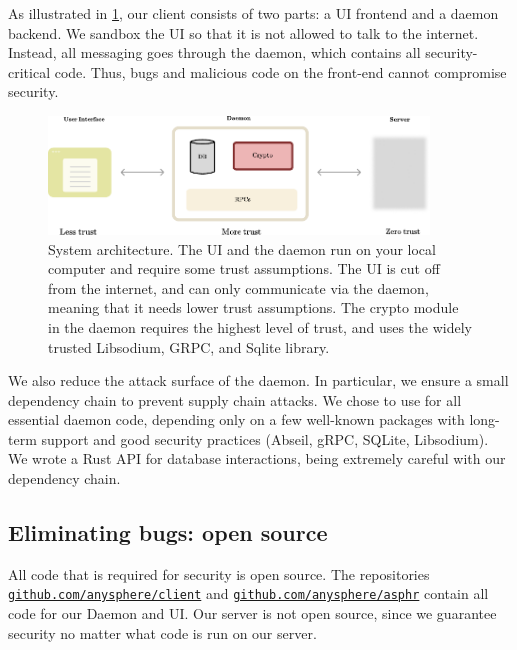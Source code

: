 As illustrated in \cref{fig:systemdiagram}, our client consists of two parts: a UI frontend and a daemon backend. We sandbox the UI so that it is not allowed to talk to the internet. Instead, all messaging goes through the daemon, which contains all security-critical code. Thus, bugs and malicious code on the front-end cannot compromise security.
\begin{figure}
    \centering
    \includegraphics[width=0.9\textwidth]{systemdiagram.pdf}
\caption{System architecture. The UI and the daemon run on your local computer and require some trust assumptions. The UI is cut off from the internet, and can only communicate via the daemon, meaning that it needs lower trust assumptions. The crypto module in the daemon requires the highest level of trust, and uses the widely trusted Libsodium, GRPC, and Sqlite library.}
\label{fig:systemdiagram}
\end{figure}

We also reduce the attack surface of the daemon. In particular, we ensure a small dependency chain to prevent supply chain attacks. We chose to use \Cpp for all essential daemon code, depending only on a few well-known packages with long-term support and good security practices (Abseil, gRPC, SQLite, Libsodium). We wrote a Rust API for database interactions, being extremely careful with our dependency chain. 


\subsection{Eliminating bugs: open source}

All code that is required for security is open source. The repositories \\ {\tt \href{https://github.com/anysphere/client}{github.com/anysphere/client}} and  {\tt \href{https://github.com/anysphere/asphr}{github.com/anysphere/asphr}} contain all code for our Daemon and UI. Our server is not open source, since we guarantee security no matter what code is run on our server. 

